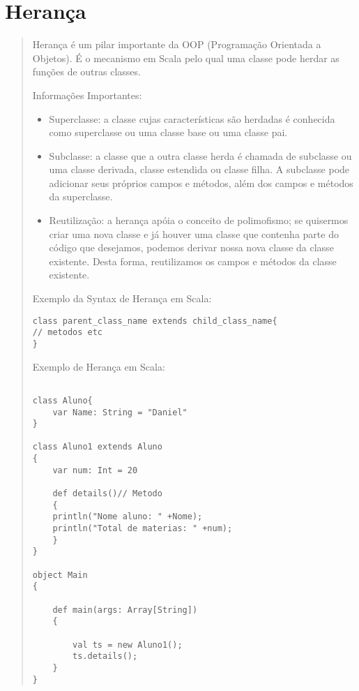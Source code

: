 \section{Herança}
\begin{quote}
Herança é um pilar importante da OOP (Programação Orientada a Objetos). É o mecanismo em Scala pelo qual uma classe pode herdar as funções de outras classes.
\cite{Wampler2021}

\hspace{2.5mm}Informações Importantes:

\begin{itemize}

\item Superclasse: a classe cujas características são herdadas é conhecida como superclasse ou uma classe base ou uma classe pai.

\item Subclasse: a classe que a outra classe herda é chamada de subclasse ou uma classe derivada, classe estendida ou classe filha. A subclasse pode adicionar seus próprios campos e métodos, além dos campos e métodos da superclasse.

\item Reutilização: a herança apóia o conceito de polimofismo;  se quisermos criar uma nova classe e já houver uma classe que contenha parte do código que desejamos, podemos derivar nossa nova classe da classe existente. Desta forma, reutilizamos os campos e métodos da classe existente.

\end{itemize}

\hspace{2.5mm} Exemplo da Syntax de Herança em Scala:

\begin{lstlisting}
class parent_class_name extends child_class_name{
// metodos etc
}
\end{lstlisting}

\hspace{2.5mm} Exemplo de Herança em Scala:

\begin{lstlisting}

class Aluno{
    var Name: String = "Daniel"
}

class Aluno1 extends Aluno
{
    var num: Int = 20

    def details()// Metodo
    {
    println("Nome aluno: " +Nome);
    println("Total de materias: " +num);
    }
}

object Main
{

    def main(args: Array[String])
    {

        val ts = new Aluno1();
        ts.details();
    }
}
\end{lstlisting}



\end{quote}

